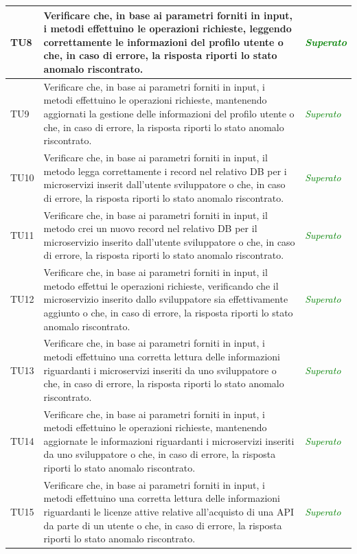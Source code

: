 \begin{longtable}{|>{\centering\arraybackslash}p{1.5cm}|>{\centering\arraybackslash}p{8cm} | >{\centering\arraybackslash}p{3.8cm}|}
		\hypertarget{TU8}{TU8} & Verificare che, in base ai parametri forniti in input, i metodi effettuino le operazioni richieste, leggendo correttamente le informazioni del profilo utente o che, in caso di errore, la risposta riporti lo stato anomalo riscontrato. & \textcolor{Green}{\textit{Superato}}\\ \hline
		\hypertarget{TU9}{TU9} & Verificare che, in base ai parametri forniti in input, i metodi effettuino le operazioni richieste, mantenendo aggiornati la gestione delle informazioni del profilo utente o che, in caso di errore, la risposta riporti lo stato anomalo riscontrato. & \textcolor{Green}{\textit{Superato}}\\ \hline
		\hypertarget{TU10}{TU10} & Verificare che, in base ai parametri forniti in input,	il metodo legga correttamente i record nel relativo DB per i microservizi inserit dall'utente sviluppatore o che, in caso di errore, la risposta riporti lo stato anomalo riscontrato. & \textcolor{Green}{\textit{Superato}}\\ \hline
		\hypertarget{TU11}{TU11} & Verificare che, in base ai parametri forniti in input, il metodo crei un nuovo record nel relativo DB per il microservizio inserito dall'utente sviluppatore o che, in caso di errore, la risposta riporti lo stato anomalo riscontrato. & \textcolor{Green}{\textit{Superato}}\\ \hline
		\hypertarget{TU12}{TU12} & Verificare che, in base ai parametri forniti in input,	il metodo effettui le operazioni richieste, verificando che il microservizio inserito dallo sviluppatore sia effettivamente aggiunto o che, in caso di errore, la risposta riporti lo stato anomalo riscontrato. & \textcolor{Green}{\textit{Superato}}\\ \hline
		\hypertarget{TU13}{TU13} & Verificare che, in base ai parametri forniti in input, i metodi effettuino una corretta lettura delle informazioni riguardanti i microservizi inseriti da uno sviluppatore o che, in caso di errore, la risposta riporti lo stato anomalo riscontrato. & \textcolor{Green}{\textit{Superato}}\\ \hline
		\hypertarget{TU14}{TU14} & Verificare che, in base ai parametri forniti in input, i metodi effettuino le operazioni richieste, mantenendo aggiornate le informazioni riguardanti i microservizi inseriti da uno sviluppatore o che, in caso di errore, la risposta riporti lo stato anomalo riscontrato. & \textcolor{Green}{\textit{Superato}}\\ \hline
		\hypertarget{TU15}{TU15} & Verificare che, in base ai parametri forniti in input, i metodi effettuino una corretta lettura delle informazioni riguardanti le licenze attive relative all'acquisto di una API da parte di un utente o che, in caso di errore, la risposta riporti lo stato anomalo riscontrato. & \textcolor{Green}{\textit{Superato}}\\ \hline

\end{longtable}
